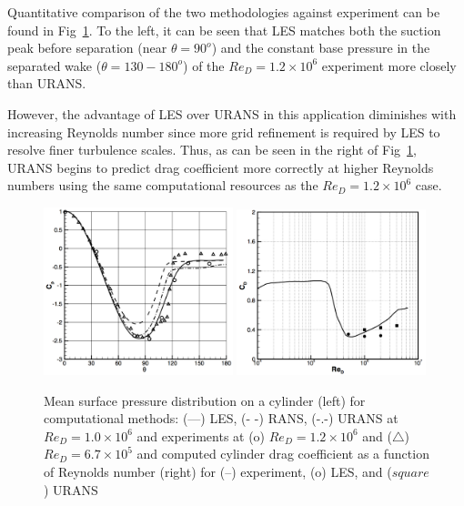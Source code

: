 \documentclass[journal]{new-aiaa}
\begin{document}
Quantitative comparison of the two methodologies against experiment can be found in Fig~\ref{fig:cylinderransvslesvalidation}. To the left, it can be seen that LES matches both the suction peak before separation (near $\theta=90^o$) and the constant base pressure in the separated wake ($\theta=130-180^o$) of the $Re_D = 1.2 \times 10^6$ experiment more closely than URANS.

However, the advantage of LES over URANS in this application diminishes with increasing Reynolds number since more grid refinement is required by LES to resolve finer turbulence scales. Thus, as can be seen in the right of Fig~\ref{fig:cylinderransvslesvalidation}, URANS begins to predict drag coefficient more correctly at higher Reynolds numbers using the same computational resources as the $Re_D = 1.2 \times 10^6$ case.





\begin{figure}[H]
\begin{center}
\includegraphics[width=0.49\textwidth]{Images/logan/catalano2003numerical_CylinderCp.pdf}
\includegraphics[width=0.49\textwidth]{Images/logan/catalano2003numerical_CylinderDrag.pdf}
\caption{ Mean surface pressure distribution on a cylinder (left) for computational methods: (---) LES, (- -) RANS, (-.-) URANS at $Re_D = 1.0 \times 10^6$ and experiments at (o) $Re_D = 1.2 \times 10^6$ and ($\triangle$) $Re_D = 6.7 \times 10^5$ and computed cylinder drag coefficient as a function of Reynolds number (right) for (--) experiment, (o) LES, and ($square$) URANS \cite{catalano2003numerical} }
\label{fig:cylinderransvslesvalidation}
\end{center}
\end{figure}
\end{document}
